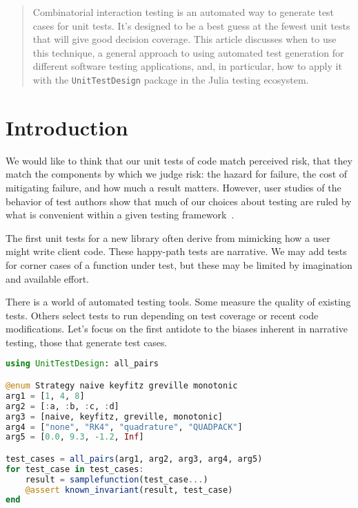 \documentclass{juliacon}
\newcommand{\utd}{\texttt{UnitTestDesign}\xspace}
\begin{document}


\maketitle

\begin{abstract}
Combinatorial interaction testing is an automated way to generate test cases for unit tests. It's designed to be a best guess at the fewest unit tests that will give good decision coverage. This article discusses when to use this technique, a general approach to using automated test generation for different software testing applications, and, in particular, how to apply it with the \utd package in the Julia testing ecosystem.
\end{abstract}

\section{Introduction}

We would like to think that our unit tests of code match perceived risk, that they match the components by which we judge risk: the hazard for failure, the cost of mitigating failure, and how much a result matters. However, user studies of the behavior of test authors show that much of our choices about testing are ruled by what is convenient within a given testing framework~\cite{Wiklund2017-ms}.

\vskip 6pt
The first unit tests for a new library often derive from mimicking how a user might write client code. These happy-path tests are narrative. We may add tests for corner cases of a function under test, but these may be limited by imagination and available effort.

\vskip 6pt
There is a world of automated testing tools. Some measure the quality of existing tests. Others select tests to run depending on test coverage or recent code modifications. Let's focus on the first antidote to the biases inherent in narrative testing, those that generate test cases.

\begin{lstlisting}[language=Julia]
using UnitTestDesign: all_pairs

@enum Strategy naive keyfitz greville monotonic
arg1 = [1, 4, 8]
arg2 = [:a, :b, :c, :d]
arg3 = [naive, keyfitz, greville, monotonic]
arg4 = ["none", "RK4", "quadrature", "QUADPACK"]
arg5 = [0.0, 9.3, -1.2, Inf]

test_cases = all_pairs(arg1, arg2, arg3, arg4, arg5)
for test_case in test_cases:
    result = samplefunction(test_case...)
    @assert known_invariant(result, test_case)
end
\end{lstlisting}
\end{document}
